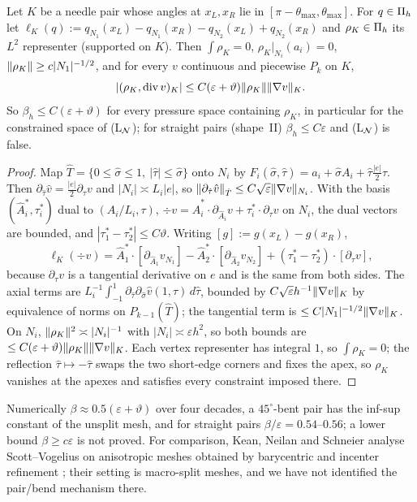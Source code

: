 \begin{proposition}\label{st:slit}
Let $K$ be a needle pair whose angles at $x_L,x_R$ lie in $[\pi-\theta_{\max},\theta_{\max}]$. For $q\in\Pi_h$ let $\ell_K(q):=q_{N_1}(x_L)-q_{N_1}(x_R)-q_{N_2}(x_L)+q_{N_2}(x_R)$ and $\rho_K\in\Pi_h$ its $L^2$ representer (supported on $K$). Then $\int\rho_K=0$, $\rho_K|_{N_i}(a_i)=0$, $\lVert \rho_K\rVert\ge c|N_1|^{-1/2}$, and for every $v$ continuous and piecewise $P_k$ on $K$,
\[
|(\rho_K,\operatorname{div} v)_K|\le C(\varepsilon+\vartheta)\lVert \rho_K\rVert\lVert \nabla v\rVert_K .
\]
So $\beta_h\le C(\varepsilon+\vartheta)$ for every pressure space containing $\rho_K$, in particular for the constrained space of (L$_\mathcal N$); for straight pairs (shape~II) $\beta_h\le C\varepsilon$ and (L$_\mathcal N$) is false.
\end{proposition}

\begin{proof}
Map $\hat T=\{0\le\hat\sigma\le1,\ |\hat\tau|\le\hat\sigma\}$ onto $N_i$ by $F_i(\hat\sigma,\hat\tau)=a_i+\hat\sigma A_i+\hat\tau\frac{|e|}2\tau$. Then $\partial_{\hat\tau}\hat v=\frac{|e|}2\partial_\tau v$ and $|N_i|\asymp L_i|e|$, so $\lVert \partial_{\hat\tau}\hat v\rVert_{\hat T}\le C\sqrt\varepsilon\lVert \nabla v\rVert_{N_i}$. With the basis $(\hat A_i^\ast,\tau_i^\ast)$ dual to $(A_i/L_i,\tau)$, $\div v=\hat A_i^\ast\cdot\partial_{\hat A_i}v+\tau_i^\ast\cdot\partial_\tau v$ on $N_i$, the dual vectors are bounded, and $|\tau_1^\ast-\tau_2^\ast|\le C\vartheta$. Writing $[g]:=g(x_L)-g(x_R)$,
\[
\ell_K(\div v)=\hat A_1^\ast\cdot[\partial_{\hat A_1}v_{N_1}]-\hat A_2^\ast\cdot[\partial_{\hat A_2}v_{N_2}]+(\tau_1^\ast-\tau_2^\ast)\cdot[\partial_\tau v],
\]
because $\partial_\tau v$ is a tangential derivative on $e$ and is the same from both sides. The axial terms are $L_i^{-1}\int_{-1}^1\partial_{\hat\tau}\partial_{\hat\sigma}\hat v(1,\hat\tau)\,d\hat\tau$, bounded by $C\sqrt\varepsilon h^{-1}\lVert \nabla v\rVert_K$ by equivalence of norms on $P_{k-1}(\hat T)$; the tangential term is $\le C|N_1|^{-1/2}\lVert \nabla v\rVert_K$. On $N_i$, $\lVert \rho_K\rVert^2\asymp|N_i|^{-1}$ with $|N_i|\asymp\varepsilon h^2$, so both bounds are $\le C(\varepsilon+\vartheta)\lVert \rho_K\rVert\lVert \nabla v\rVert_K$. Each vertex representer has integral $1$, so $\int\rho_K=0$; the reflection $\hat\tau\mapsto-\hat\tau$ swaps the two short-edge corners and fixes the apex, so $\rho_K$ vanishes at the apexes and satisfies every constraint imposed there.
\end{proof}

Numerically $\beta\approx0.5(\varepsilon+\vartheta)$ over four decades, a $45^\circ$-bent pair has the inf-sup constant of the unsplit mesh, and for straight pairs $\beta/\varepsilon=0.54$--$0.56$; a lower bound $\beta\ge c\varepsilon$ is not proved. For comparison, Kean, Neilan and Schneier analyse Scott--Vogelius on anisotropic meshes obtained by barycentric and incenter refinement \cite{KeanNeilanSchneier2022}; their setting is macro-split meshes, and we have not identified the pair/bend mechanism there.

